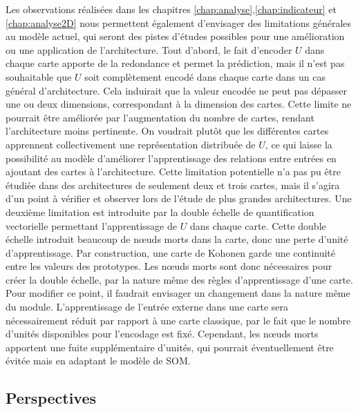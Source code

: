 Les observations réalisées dans les chapitres \ref{chap:analyse},\ref{chap:indicateur} et \ref{chap:analyse2D} nous permettent également d'envisager des limitations générales au modèle actuel, qui seront des pistes d'études possibles pour une amélioration ou une application de l'architecture.
Tout d'abord, le fait d'encoder $U$ dans chaque carte apporte de la redondance et permet la prédiction, mais il n'est pas souhaitable que $U$ soit complètement encodé dans chaque carte dans un cas général d'architecture.
Cela induirait que la valeur encodée ne peut pas dépasser une ou deux dimensions, correspondant à la dimension des cartes. Cette limite ne pourrait être améliorée par l'augmentation du nombre de cartes, rendant l'architecture moins pertinente. 
On voudrait plutôt que les différentes cartes apprennent collectivement une représentation distribuée de $U$, ce qui laisse la possibilité au modèle d'améliorer l'apprentissage des relations entre entrées en ajoutant des cartes à l'architecture. Cette limitation potentielle n'a pas pu être étudiée dans des architectures de seulement deux et trois cartes, mais il s'agira d'un point à vérifier et observer lors de l'étude de plus grandes architectures. 
Une deuxième limitation est introduite par la double échelle de quantification vectorielle permettant l'apprentissage de $U$ dans chaque carte. 
Cette double échelle introduit beaucoup de n\oe{}uds morts dans la carte, donc une perte d'unité d'apprentissage. 
Par construction, une carte de Kohonen garde une continuité entre les valeurs des prototypes. Les n\oe{}uds morts sont donc nécessaires pour créer la double échelle, par la nature même des règles d'apprentissage d'une carte.
Pour modifier ce point, il faudrait envisager un changement dans la nature même du module.
L'apprentissage de l'entrée externe dans une carte sera nécessairement réduit par rapport à une carte classique, par le fait que le nombre d'unités disponibles pour l'encodage est fixé.
Cependant, les n\oe{}uds morts apportent une fuite supplémentaire d'unités, qui pourrait éventuellement être évitée mais en adaptant le modèle de SOM.
   

\subsection*{Perspectives}

